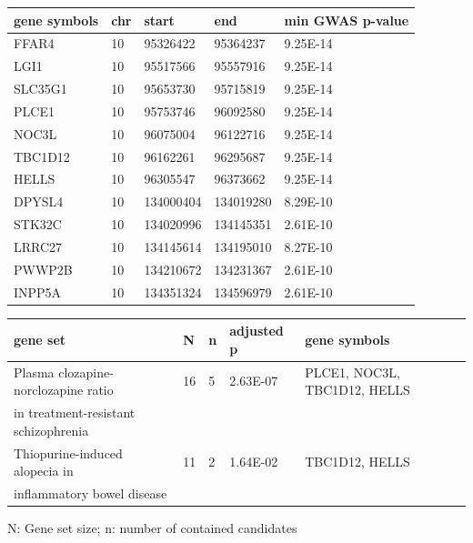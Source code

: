 \begin{refsection}
\begin{table}[H]
\small
{}\selectfont
{} \label{table3S5} 
\centering
\begin{tabular}{@{}lllll@{}}
\hline
gene symbols & chr & start     & end       & min GWAS p-value \\ \hline
FFAR4        & 10  & 95326422  & 95364237  & 9.25E-14         \\
LGI1         & 10  & 95517566  & 95557916  & 9.25E-14         \\
SLC35G1      & 10  & 95653730  & 95715819  & 9.25E-14         \\
PLCE1        & 10  & 95753746  & 96092580  & 9.25E-14         \\
NOC3L        & 10  & 96075004  & 96122716  & 9.25E-14         \\
TBC1D12      & 10  & 96162261  & 96295687  & 9.25E-14         \\
HELLS        & 10  & 96305547  & 96373662  & 9.25E-14         \\
DPYSL4       & 10  & 134000404 & 134019280 & 8.29E-10         \\
STK32C       & 10  & 134020996 & 134145351 & 2.61E-10         \\
LRRC27       & 10  & 134145614 & 134195010 & 8.27E-10         \\
PWWP2B       & 10  & 134210672 & 134231367 & 2.61E-10         \\
INPP5A       & 10  & 134351324 & 134596979 & 2.61E-10         \\ \hline
\end{tabular}
\end{table}


\begin{table}[H]
\small
{}\selectfont
{} \label{table3S6} 
\centering
\begin{tabular}{@{}lllll@{}}
\hline
gene set                              & N  & n & adjusted p & gene symbols                 \\ \hline
Plasma clozapine-norclozapine ratio   & 16 & 5 & 2.63E-07   & PLCE1, NOC3L, TBC1D12, HELLS \\
in treatment-resistant schizophrenia &    &   &            &                              \\
Thiopurine-induced alopecia in        & 11 & 2 & 1.64E-02   & TBC1D12, HELLS               \\
inflammatory bowel disease            &    &   &            &                              \\ \hline
\end{tabular}
N: Gene set size; n: number of contained candidates
\end{table}



\end{refsection}
